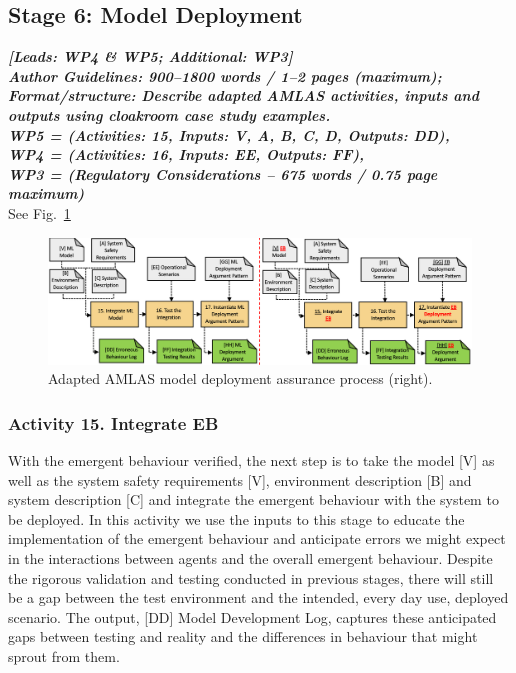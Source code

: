 \documentclass[lettersize,journal]{IEEEtran}
\begin{document}
\subsection{Stage 6: Model Deployment} \label{framework-stage6}
\noindent \textbf{\textit{[Leads:  WP4 \& WP5; Additional: WP3]}}\\ 
\noindent\textbf{\textit{Author Guidelines: 900–1800 words / 1–2 pages (maximum); \\Format/structure: Describe adapted AMLAS activities, inputs and outputs using cloakroom case study examples.\\ 
\noindent WP5 = (Activities: 15, Inputs: V, A, B, C, D, Outputs: DD), \\
\noindent WP4 = (Activities: 16, Inputs: EE, Outputs: FF), \\
\noindent WP3 = (Regulatory Considerations – 675 words / 0.75 page maximum)}}\\
See Fig.~\ref{amlas-a-stage6}
\begin{figure}
	\centering
	\includegraphics[width=1.0\textwidth]{figures/amlas-a-stage6.png}
	\caption{Adapted AMLAS model deployment assurance process (right).}
	\label{amlas-a-stage6}
\end{figure}

\subsubsection*{Activity 15. Integrate EB}

With the emergent behaviour verified, the next step is to take the model [V] as well as the system safety requirements [V], environment description [B] and system description [C] and integrate the emergent behaviour with the system to be deployed. In this activity we use the inputs to this stage to educate the implementation of the emergent behaviour and anticipate errors we might expect in the interactions between agents and the overall emergent behaviour. Despite the rigorous validation and testing conducted in previous stages, there will still be a gap between the test environment and the intended, every day use, deployed scenario. The output, [DD] Model Development Log, captures these anticipated gaps between testing and reality and the differences in behaviour that might sprout from them.
\end{document}
